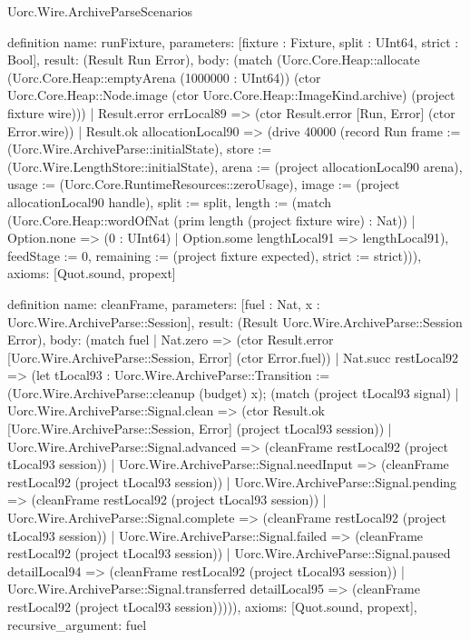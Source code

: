 \begin{lexlean}{Uorc.Wire.ArchiveParseScenarios}
\begin{semanticmodule}
definition{
  name: runFixture,
  parameters: [fixture : Fixture, split : UInt64, strict : Bool],
  result: (Result Run Error),
  body: (match (Uorc.Core.Heap::allocate (Uorc.Core.Heap::emptyArena (1000000 : UInt64)) (ctor Uorc.Core.Heap::Node.image (ctor Uorc.Core.Heap::ImageKind.archive) (project fixture wire)))
    | Result.error errLocal89 => (ctor Result.error [Run, Error] (ctor Error.wire))
    | Result.ok allocationLocal90 => (drive 40000 (record Run {frame := (Uorc.Wire.ArchiveParse::initialState), store := (Uorc.Wire.LengthStore::initialState), arena := (project allocationLocal90 arena), usage := (Uorc.Core.RuntimeResources::zeroUsage), image := (project allocationLocal90 handle), split := split, length := (match (Uorc.Core.Heap::wordOfNat (prim length (project fixture wire) : Nat))
      | Option.none => (0 : UInt64)
      | Option.some lengthLocal91 => lengthLocal91), feedStage := 0, remaining := (project fixture expected), strict := strict}))),
  axioms: [Quot.sound, propext]
}

definition{
  name: cleanFrame,
  parameters: [fuel : Nat, x : Uorc.Wire.ArchiveParse::Session],
  result: (Result Uorc.Wire.ArchiveParse::Session Error),
  body: (match fuel
    | Nat.zero => (ctor Result.error [Uorc.Wire.ArchiveParse::Session, Error] (ctor Error.fuel))
    | Nat.succ restLocal92 => (let tLocal93 : Uorc.Wire.ArchiveParse::Transition := (Uorc.Wire.ArchiveParse::cleanup (budget) x); (match (project tLocal93 signal)
      | Uorc.Wire.ArchiveParse::Signal.clean => (ctor Result.ok [Uorc.Wire.ArchiveParse::Session, Error] (project tLocal93 session))
      | Uorc.Wire.ArchiveParse::Signal.advanced => (cleanFrame restLocal92 (project tLocal93 session))
      | Uorc.Wire.ArchiveParse::Signal.needInput => (cleanFrame restLocal92 (project tLocal93 session))
      | Uorc.Wire.ArchiveParse::Signal.pending => (cleanFrame restLocal92 (project tLocal93 session))
      | Uorc.Wire.ArchiveParse::Signal.complete => (cleanFrame restLocal92 (project tLocal93 session))
      | Uorc.Wire.ArchiveParse::Signal.failed => (cleanFrame restLocal92 (project tLocal93 session))
      | Uorc.Wire.ArchiveParse::Signal.paused detailLocal94 => (cleanFrame restLocal92 (project tLocal93 session))
      | Uorc.Wire.ArchiveParse::Signal.transferred detailLocal95 => (cleanFrame restLocal92 (project tLocal93 session))))),
  axioms: [Quot.sound, propext],
  recursive_argument: fuel
}


\end{semanticmodule}
\end{lexlean}
